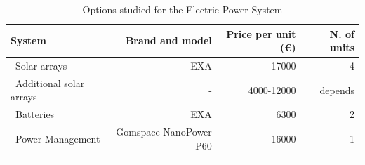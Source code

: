 \begin{longtable}{| l | r | r | r | }
\hline
\rowcolor[gray]{0.80}	\textbf{System} &  \textbf{Brand and model}     & \textbf{Price per unit (\euro)}  & \textbf{N. of units}  \\
\hline
\endfirsthead

	   ~Solar arrays & EXA & 17000 & 4\\
	   ~Additional solar arrays & - & 4000-12000 & depends\\
	   ~Batteries & EXA & 6300 & 2 \\
	   ~Power Management & Gomspace NanoPower P60 & 16000 & 1 \\
	\hline

\caption{Options studied for the Electric Power System}
\label{epsfinal}
\end{longtable}